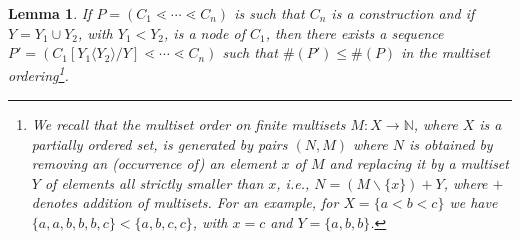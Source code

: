 \documentclass{article}
\theoremstyle{plain}
\newtheorem{lemma}[thm]{Lemma}
\theoremstyle{definition}
\newcommand{\set}[1]{\{#1\}}
\begin{document}
\begin{lemma}\label{claim1} If $P=(C_1\lessdot \cdots\lessdot C_n)$ is such that $C_n$ is a construction and if $Y=Y_1 \cup Y_2$, with $Y_1 <Y_2$, is a node of $C_1$, then there exists a sequence $P'=(C_1[Y_1\langle Y_2\rangle/Y]\lessdot \cdots\lessdot C_n)$ such that $\#(P')\leq\#(P)$ in the multiset ordering\footnote{We recall that the multiset order on finite multisets $M:X\rightarrow\mathbb{N}$, where $X$ is a partially ordered set, is generated by pairs $(N,M)$ where $N$ is obtained by removing an (occurrence of) an element $x$ of $M$ and replacing it by a multiset $Y$ of elements all strictly smaller than $x$, i.e., 
$N=(M\backslash\set{x})+Y$, where $+$ denotes addition of multisets. For an example, for $X=\set{a<b<c}$ we have $\set{a,a,b,b,b,c} < \set{a,b,c,c}$, with $x=c$ and $Y=\set{a,b,b}$.}. 
\end{lemma} 
\end{document}

